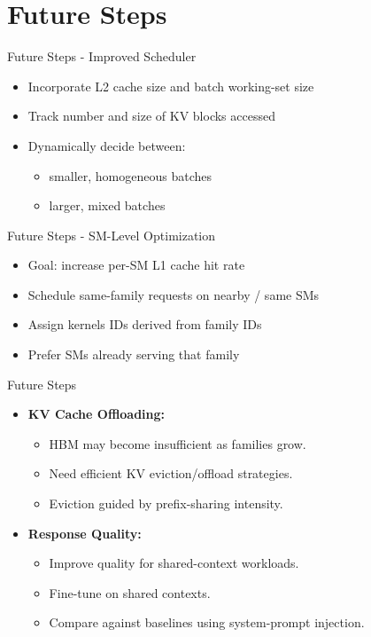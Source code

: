 \documentclass[Serif, 10pt, brown]{beamer}
\theoremstyle{example}
\theoremstyle{plain}
\begin{document}
\section{Future Steps}

\begin{frame}{Future Steps - Improved Scheduler}
\begin{itemize}
    \item Incorporate L2 cache size and batch working-set size
    \item Track number and size of KV blocks accessed
    \item Dynamically decide between:
    \begin{itemize}
        \item smaller, homogeneous batches
        \item larger, mixed batches
    \end{itemize}
\end{itemize}
\end{frame}


\begin{frame}{Future Steps - SM-Level Optimization}
\begin{itemize}
    \item Goal: increase per-SM L1 cache hit rate
    \item Schedule same-family requests on nearby / same SMs
    \item Assign kernels IDs derived from family IDs
    \item Prefer SMs already serving that family
\end{itemize}
\end{frame}


\begin{frame}{Future Steps}
\begin{itemize}
    \item \textbf{KV Cache Offloading:}
    \begin{itemize}
        \item HBM may become insufficient as families grow.
        \item Need efficient KV eviction/offload strategies.
        \item Eviction guided by prefix-sharing intensity.
    \end{itemize}\pause

    \item \textbf{Response Quality:}
    \begin{itemize}
        \item Improve quality for shared-context workloads.
        \item Fine-tune on shared contexts.
        \item Compare against baselines using system-prompt injection.
    \end{itemize}
\end{itemize}
\end{frame}
\end{document}
